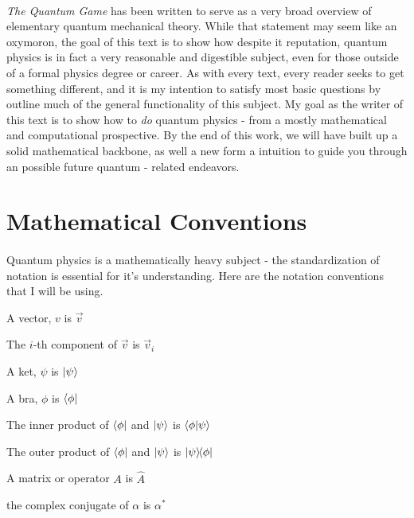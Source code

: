 \documentclass[12pt,letterpaper]{book}
\begin{document}
\paragraph*{}\textit{The Quantum Game} has been written to serve as a very broad overview of elementary quantum mechanical theory. While that statement may seem like an oxymoron, the goal of this text is to show how despite it reputation, quantum physics is in fact a very reasonable and digestible subject, even for those outside of a formal physics degree or career. As with every text, every reader seeks to get something different, and it is my intention to satisfy most basic questions  by outline much of the general functionality of this subject. My goal as the writer of this text is to show how to \textit{do} quantum physics - from a mostly mathematical and computational prospective. By the end of this work, we will have built up a solid mathematical backbone, as well a new form a intuition to guide you through an possible future quantum - related endeavors.

\vspace*{6cm}

\pagebreak


\section*{Mathematical Conventions}
\paragraph*{}Quantum physics is a mathematically heavy subject - the standardization of notation is essential for it's understanding. Here are the notation conventions that I will be using.

\begin{itemize}

\begin{multicols}{2}

\item A vector, $v$ is $\vec{v}$
\item The $i$-th component of $\vec{v}$ is $\vec{v}_i$
\item A ket, $\psi$ is $\ket{\psi}$
\item A bra, $\phi$ is $\bra{\phi}$
\item The inner product of $\bra{\phi}$ and $\ket{\psi}$ is 
$\braket{\phi}{\psi}$
\item The outer product of $\bra{\phi}$ and $\ket{\psi}$ is 
$\ketbra{\psi}{\phi}$
\item A matrix or operator $A$ is $\hat{A}$

\columnbreak

\item the complex conjugate of $\alpha$ is $\alpha^*$
\item
\item
\item

\end{multicols}

\end{itemize}
\end{document}
